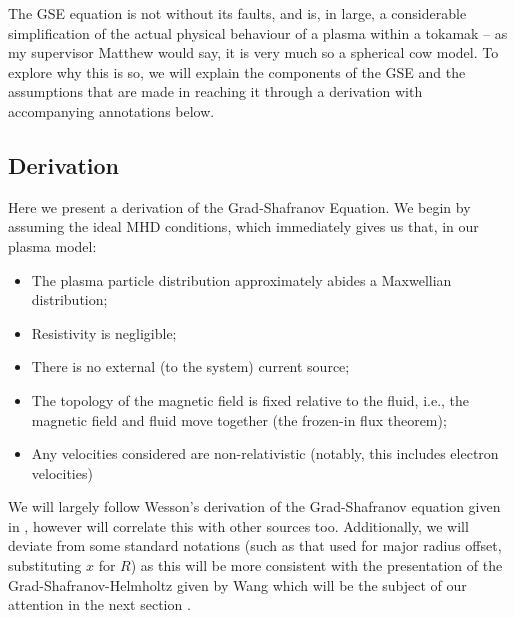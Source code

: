 The GSE equation is not without its faults, and is, in large, a considerable simplification of the actual physical behaviour 
of a plasma within a tokamak -- as my supervisor Matthew would say, it is very much so a spherical cow model. To explore 
why this is so, we will explain the components of the GSE and the assumptions that are made in reaching it through a 
derivation with accompanying annotations below.

\subsection{Derivation}

Here we present a derivation of the Grad-Shafranov Equation. We begin by assuming the ideal MHD conditions, which 
immediately gives us that, in our plasma model:
\begin{itemize}
    \item The plasma particle distribution approximately abides a Maxwellian distribution;
    \item Resistivity is negligible;
    \item There is no external (to the system) current source;
    \item The topology of the magnetic field is fixed relative to the fluid, i.e., the magnetic field and fluid move together (the frozen-in flux theorem);
    \item Any velocities considered are non-relativistic (notably, this includes electron velocities)
\end{itemize}

\begin{remark}
    We will largely follow Wesson's derivation of the Grad-Shafranov equation given in \cite{wesson-tokamaks}, however 
    will correlate this with other sources too. Additionally, we will deviate from some standard notations (such as 
    that used for major radius offset, substituting $x$ for $R$) as this will be more consistent with the presentation 
    of the Grad-Shafranov-Helmholtz given by Wang which will be the subject of our 
    attention in the next section \cite{wang-analytic-solution}.
\end{remark}

